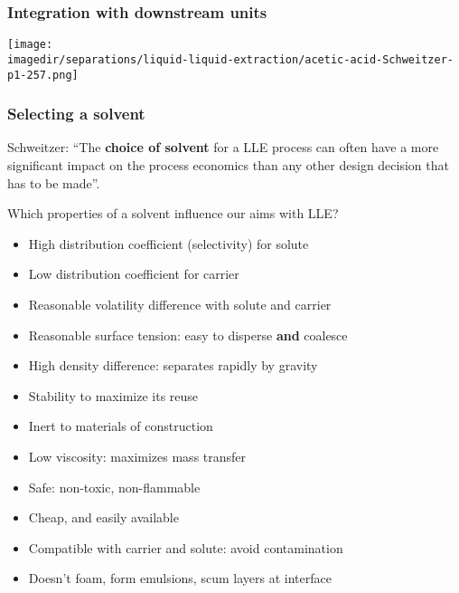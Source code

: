 \begin{frame}\frametitle{Integration with downstream units}
	\begin{center}
		\texttt{[image: \\imagedir/separations/liquid-liquid-extraction/acetic-acid-Schweitzer-p1-257.png]}
	\end{center}
	\vspace{-10pt}
\end{frame}

\begin{frame}\frametitle{Selecting a solvent}
	Schweitzer: ``The \textbf{choice of solvent} for a LLE process can often have a more significant impact on the process economics than any other design decision that has to be made''.
	
	\vspace{12pt}
	Which properties of a solvent influence our aims with LLE?
	\begin{itemize}
		\item	High distribution coefficient (selectivity) for solute 
		\item	Low distribution coefficient for carrier
		\item	Reasonable volatility difference with solute and carrier
		\item	Reasonable surface tension: easy to disperse \textbf{and} coalesce
		\item	High density difference: separates rapidly by gravity
		\item	Stability to maximize its reuse
		\item	Inert to materials of construction
		\item	Low viscosity: maximizes mass transfer
		\item	Safe: non-toxic, non-flammable
		\item	Cheap, and easily available
		\item	Compatible with carrier and solute: avoid contamination
		\item	Doesn't foam, form emulsions, scum layers at interface
	\end{itemize}
\end{frame}

